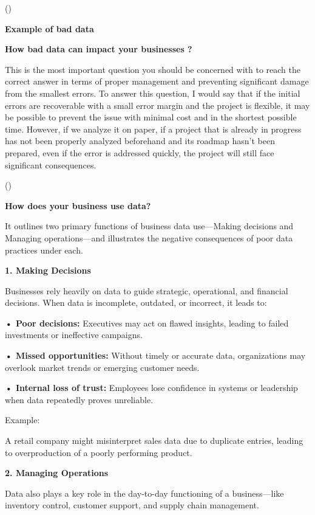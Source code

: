 \documentclass[
  man,
  floatsintext,
  longtable,
  nolmodern,
  notxfonts,
  notimes,
  colorlinks=true,linkcolor=blue,citecolor=blue,urlcolor=blue]{apa7}
\begin{document}
()

\textbf{Example of bad data}

\textbf{How bad data can impact your businesses ?}

This is the most important question you should be concerned with to
reach the correct answer in terms of proper management and preventing
significant damage from the smallest errors. To answer this question, I
would say that if the initial errors are recoverable with a small error
margin and the project is flexible, it may be possible to prevent the
issue with minimal cost and in the shortest possible time. However, if
we analyze it on paper, if a project that is already in progress has not
been properly analyzed beforehand and its roadmap hasn't been prepared,
even if the error is addressed quickly, the project will still face
significant consequences.

()

\textbf{How does your business use data?}

It outlines two primary functions of business data use---Making
decisions and Managing operations---and illustrates the negative
consequences of poor data practices under each.

\textbf{1. Making Decisions}

Businesses rely heavily on data to guide strategic, operational, and
financial decisions. When data is incomplete, outdated, or incorrect, it
leads to:

\textbf{• Poor decisions:} Executives may act on flawed insights,
leading to failed investments or ineffective campaigns.

\textbf{• Missed opportunities:} Without timely or accurate data,
organizations may overlook market trends or emerging customer needs.

\textbf{• Internal loss of trust:} Employees lose confidence in systems
or leadership when data repeatedly proves unreliable.

Example:

A retail company might misinterpret sales data due to duplicate entries,
leading to overproduction of a poorly performing product.

\textbf{2. Managing Operations}

Data also plays a key role in the day-to-day functioning of a
business---like inventory control, customer support, and supply chain
management.
\end{document}
